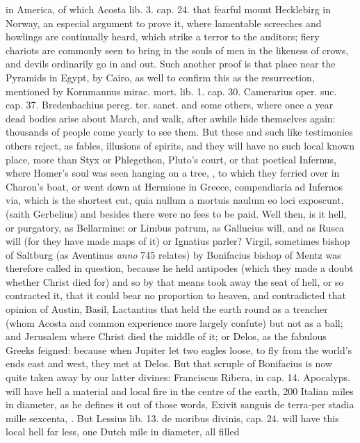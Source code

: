 {in America, of which Acosta lib. 3. cap. 24. that fearful mount
Hecklebirg in Norway, an especial argument to prove it, where
lamentable screeches and howlings are continually heard, which strike a
terror to the auditors; fiery chariots are commonly seen to bring in
the souls of men in the likeness of crows, and devils ordinarily go in
and out. Such another proof is that place near the Pyramids in Egypt,
by Cairo, as well to confirm this as the resurrection, mentioned by
Kornmannus mirac. mort. lib. 1. cap. 30. Camerarius oper. suc.
cap. 37. Bredenbachius pereg. ter. sanct. and some others, where once a
year dead bodies arise about March, and walk, after awhile hide
themselves again: thousands of people come yearly to see them. But
these and such like testimonies others reject, as fables, illusions of
spirits, and they will have no such local known place, more than Styx
or Phlegethon, Pluto's court, or that poetical Infernus, where Homer's
soul was seen hanging on a tree, \etc{}, to which they ferried over in
Charon's boat, or went down at Hermione in Greece, compendiaria ad
Infernos via, which is the shortest cut, quia nullum a mortuis naulum
eo loci exposcunt, (saith Gerbelius) and besides there were no
fees to be paid. Well then, is it hell, or purgatory, as Bellarmine: or
Limbus patrum, as Gallucius will, and as Rusca will (for they have made
maps of it) or Ignatius parler? Virgil, sometimes bishop of
Saltburg (as Aventinus \emph{anno} 745 relates) by Bonifacius bishop of
Mentz was therefore called in question, because he held antipodes
(which they made a doubt whether Christ died for) and so by that means
took away the seat of hell, or so contracted it, that it could bear no
proportion to heaven, and contradicted that opinion of Austin, Basil,
Lactantius that held the earth round as a trencher (whom Acosta and
common experience more largely confute) but not as a ball; and
Jerusalem where Christ died the middle of it; or Delos, as the fabulous
Greeks feigned: because when Jupiter let two eagles loose, to fly from
the world's ends east and west, they met at Delos. But that scruple of
Bonifacius is now quite taken away by our latter divines: Franciscus
Ribera, in cap. 14. Apocalyps. will have hell a material and local fire
in the centre of the earth, 200 Italian miles in diameter, as he
defines it out of those words, Exivit sanguis de terra-per stadia mille
sexcenta, \etc{}. But Lessius lib. 13. de moribus divinis, cap. 24. will
have this local hell far less, one Dutch mile in diameter, all filled
}
